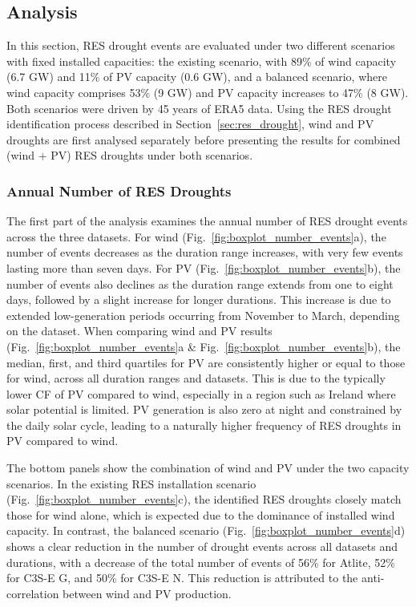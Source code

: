 \documentclass[a4paper, 11p1t]{article}
\begin{document}
\newpage
\subsection{Analysis}
\label{sec:Analysis}

In this section, RES drought events are evaluated under two different scenarios with fixed installed capacities: the existing scenario, with 89\% of wind capacity (6.7 GW) and 11\% of PV capacity (0.6 GW), and a balanced scenario, where wind capacity comprises 53\% (9 GW) and PV capacity increases to 47\% (8 GW). Both scenarios were driven by 45 years of ERA5 data. Using the RES drought identification process described in Section~\ref{sec:res_drought}, wind and PV droughts are first analysed separately before presenting the results for combined (wind + PV) RES droughts under both scenarios.

\subsubsection{Annual Number of RES Droughts}

The first part of the analysis examines the annual number of RES drought events across the three datasets. For wind (Fig.~\ref{fig:boxplot_number_events}a), the number of events decreases as the duration range increases, with very few events lasting more than seven days. For PV (Fig.~\ref{fig:boxplot_number_events}b), the number of events also declines as the duration range extends from one to eight days, followed by a slight increase for longer durations. This increase is due to extended low-generation periods occurring from November to March, depending on the dataset. When comparing wind and PV results (Fig.~\ref{fig:boxplot_number_events}a \& Fig.~\ref{fig:boxplot_number_events}b), the median, first, and third quartiles for PV are consistently higher or equal to those for wind, across all duration ranges and datasets. This is due to the typically lower CF of PV compared to wind, especially in a region such as Ireland where solar potential is limited. PV generation is also zero at night and constrained by the daily solar cycle, leading to a naturally higher frequency of RES droughts in PV compared to wind.

The bottom panels show the combination of wind and PV under the two capacity scenarios. In the existing RES installation scenario (Fig.~\ref{fig:boxplot_number_events}c), the identified RES droughts closely match those for wind alone, which is expected due to the dominance of installed wind capacity. In contrast, the balanced scenario (Fig.~\ref{fig:boxplot_number_events}d) shows a clear reduction in the number of drought events across all datasets and durations, with a decrease of the total number of events of 56\% for Atlite, 52\% for C3S-E G, and 50\% for C3S-E N. This reduction is attributed to the anti-correlation between wind and PV production.
\end{document}
